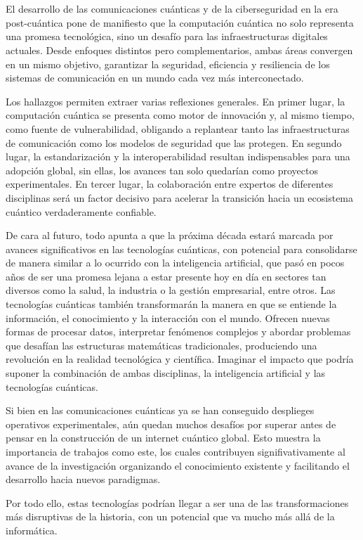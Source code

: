 \chapter{\conclusionsname}

El desarrollo de las comunicaciones cuánticas y de la ciberseguridad en la era post-cuántica pone de manifiesto que la computación cuántica no solo representa una promesa tecnológica, sino un desafío para las infraestructuras digitales actuales. Desde enfoques distintos pero complementarios, ambas áreas convergen en un mismo objetivo, garantizar la seguridad, eficiencia y resiliencia de los sistemas de comunicación en un mundo cada vez más interconectado.

Los hallazgos permiten extraer varias reflexiones generales. En primer lugar, la computación cuántica se presenta como motor de innovación y, al mismo tiempo, como fuente de vulnerabilidad, obligando a replantear tanto las infraestructuras de comunicación como los modelos de seguridad que las protegen. En segundo lugar, la estandarización y la interoperabilidad resultan indispensables para una adopción global, sin ellas, los avances tan solo quedarían como proyectos experimentales. En tercer lugar, la colaboración entre expertos de diferentes disciplinas será un factor decisivo para acelerar la transición hacia un ecosistema cuántico verdaderamente confiable.

De cara al futuro, todo apunta a que la próxima década estará marcada por avances significativos en las tecnologías cuánticas, con potencial para consolidarse de manera similar a lo ocurrido con la inteligencia artificial, que pasó en pocos años de ser una promesa lejana a estar presente hoy en día en sectores tan diversos como la salud, la industria o la gestión empresarial, entre otros. Las tecnologías cuánticas también transformarán la manera en que se entiende la información, el conocimiento y la interacción con el mundo. Ofrecen nuevas formas de procesar datos, interpretar fenómenos complejos y abordar problemas que desafían las estructuras matemáticas tradicionales, produciendo una revolución en la realidad tecnológica y científica. Imaginar el impacto que podría suponer la combinación de ambas disciplinas, la inteligencia artificial y las tecnologías cuánticas.

Si bien en las comunicaciones cuánticas ya se han conseguido desplieges operativos experimentales, aún quedan muchos desafíos por superar antes de pensar en la construcción de un internet cuántico global. Esto muestra la importancia de trabajos como este, los cuales contribuyen signifivativamente al avance de la investigación organizando el conocimiento existente y facilitando el desarrollo hacia nuevos paradigmas.

Por todo ello, estas tecnologías podrían llegar a ser una de las transformaciones más disruptivas de la historia, con un potencial que va mucho más allá de la informática.

